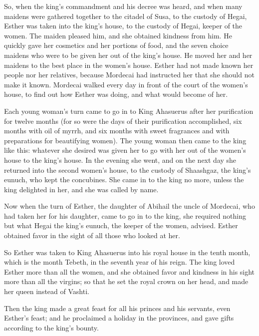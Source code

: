  So, when the king's commandment and his decree was heard,
and when many maidens were gathered together to the citadel of Susa, to
the custody of Hegai, Esther was taken into the king's house, to the
custody of Hegai, keeper of the women.  The maiden pleased
him, and she obtained kindness from him. He quickly gave her cosmetics
and her portions of food, and the seven choice maidens who were to be
given her out of the king's house. He moved her and her maidens to the
best place in the women's house.  Esther had not made
known her people nor her relatives, because Mordecai had instructed her
that she should not make it known.  Mordecai walked every
day in front of the court of the women's house, to find out how Esther
was doing, and what would become of her.

 Each young woman's turn came to go in to King Ahasuerus
after her purification for twelve months (for so were the days of their
purification accomplished, six months with oil of myrrh, and six months
with sweet fragrances and with preparations for beautifying women).
 The young woman then came to the king like this:
whatever she desired was given her to go with her out of the women's
house to the king's house.  In the evening she went, and
on the next day she returned into the second women's house, to the
custody of Shaashgaz, the king's eunuch, who kept the concubines. She
came in to the king no more, unless the king delighted in her, and she
was called by name.

 Now when the turn of Esther, the daughter of Abihail the
uncle of Mordecai, who had taken her for his daughter, came to go in to
the king, she required nothing but what Hegai the king's eunuch, the
keeper of the women, advised. Esther obtained favor in the sight of all
those who looked at her.

 So Esther was taken to King Ahasuerus into his royal
house in the tenth month, which is the month Tebeth, in the seventh year
of his reign.  The king loved Esther more than all the
women, and she obtained favor and kindness in his sight more than all
the virgins; so that he set the royal crown on her head, and made her
queen instead of Vashti.

 Then the king made a great feast for all his princes and
his servants, even Esther's feast; and he proclaimed a holiday in the
provinces, and gave gifts according to the king's bounty.

